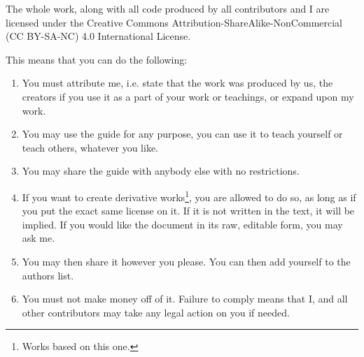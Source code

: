 \documentclass[../main.tex]{subfiles}
\begin{document}
The whole work, along with all code produced by all contributors and I are licensed
under the Creative Commons Attribution-ShareAlike-NonCommercial (CC BY-SA-NC) 4.0 International License.

This means that you can do the following:
\begin{enumerate}
\item You must attribute me, i.e. state that the work was produced by us, the creators if
you use it as a part of your work or teachings, or expand upon my work.

\item You may use the guide for any purpose, you can use it to teach yourself or teach
others, whatever you like.

\item You may share the guide with anybody else with no restrictions.

\item If you want to create derivative works\footnote{Works based on this one.}, you are allowed to do so, as long as if
you put the exact same license on it. If it is not written in the text, it will be
implied. If you would like the document in its raw, editable form, you may ask
me.

\item You may then share it however you please. You can then add yourself to
the authors list.

\item You must not make money off of it. Failure to comply means that I, and all
other contributors may take any legal action on you if needed.

\end{enumerate}
\end{document}
